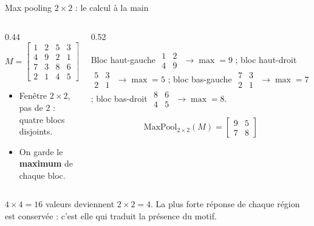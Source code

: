 \begin{frame}{Max pooling $2\times 2$ : le calcul à la main}
\begin{columns}[t]
\begin{column}{0.44\textwidth}
\[
M=\begin{bmatrix}
1 & 2 & 5 & 3\\
4 & 9 & 2 & 1\\
7 & 3 & 8 & 6\\
2 & 1 & 4 & 5
\end{bmatrix}
\]
\begin{itemize}
  \item Fenêtre $2 \times 2$, pas de $2$ : quatre blocs disjoints.
  \item On garde le \textbf{maximum} de chaque bloc.
\end{itemize}
\end{column}
\begin{column}{0.52\textwidth}
\begin{ebox}
Bloc haut-gauche $\begin{smallmatrix}1&2\\4&9\end{smallmatrix}$
$\to \max = 9$ ;
bloc haut-droit $\begin{smallmatrix}5&3\\2&1\end{smallmatrix}$
$\to \max = 5$ ;
bloc bas-gauche $\begin{smallmatrix}7&3\\2&1\end{smallmatrix}$
$\to \max = 7$ ;
bloc bas-droit $\begin{smallmatrix}8&6\\4&5\end{smallmatrix}$
$\to \max = 8$.
\end{ebox}
\[
\mathrm{MaxPool}_{2\times2}(M)=
\begin{bmatrix}
9 & 5\\
7 & 8
\end{bmatrix}
\]
\end{column}
\end{columns}
\vspace{1mm}
\begin{kbox}[Lecture]
$4 \times 4 = 16$ valeurs deviennent $2 \times 2 = 4$. La plus forte réponse
de chaque région est conservée : c'est elle qui traduit la présence du motif.
\end{kbox}
\end{frame}

